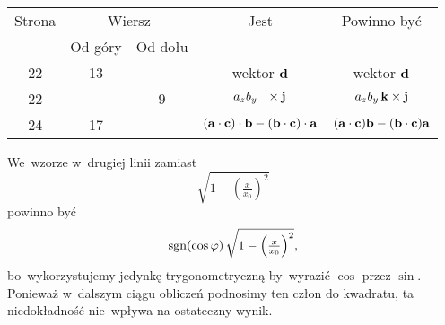\documentclass[a4paper,11pt]{article}
\begin{document}
\begin{center}

  \begin{tabular}{|c|c|c|c|c|}
    \hline
    Strona & \multicolumn{2}{c|}{Wiersz} & Jest
                              & Powinno być \\ \cline{2-3}
    & Od góry & Od dołu & & \\
    \hline
    22 & 13 & & wektor{ }{ }{ }$\mathbf{d}$ & wektor $\mathbf{d}$ \\
    22 & &  9 & $a_{ z } b_{ y } \, \hphantom{k} \times \mathbf{j}$
           & $a_{ z } b_{ y } \, \mathbf{k} \times \mathbf{j}$ \\
    24 & 17 & &  $( \mathbf{a} \cdot \mathbf{c} ) \cdot \mathbf{b}
                - ( \mathbf{b} \cdot \mathbf{c} ) \cdot \mathbf{a}$
           & $( \mathbf{a} \cdot \mathbf{c} ) \mathbf{b}
             - ( \mathbf{b} \cdot \mathbf{c} ) \mathbf{a}$ \\
    \hline
  \end{tabular}

\end{center}

\vspace{\spaceTwo}













\newpage


\vspace{0em}



\vspace{0em}


\noindent
{} We~wzorze w~drugiej linii zamiast
\begin{equation}
  \label{eq:Skalmierski-MechanikaZWytrzymalosciaETC-01}
  \sqrt{ 1 - \left( \tfrac{ x }{ x_{ 0 } } \right)^{ 2 } }
\end{equation}
powinno być
\begin{equation}
  \label{eq:SkalmierskiMechanikaZWytrzymaloscia-02}
  \textrm{sgn}( \cos \varphi ) \,
  \sqrt{ 1 - \left( \tfrac{ x }{ x_{ 0 } } \right)^{ 2 } },
\end{equation}
bo~wykorzystujemy jedynkę trygonometryczną by~wyrazić $\cos$ przez
$\sin$. Ponieważ w~dalszym ciągu obliczeń podnosimy ten człon do
kwadratu, ta niedokładność nie~wpływa na ostateczny wynik.
\end{document}
